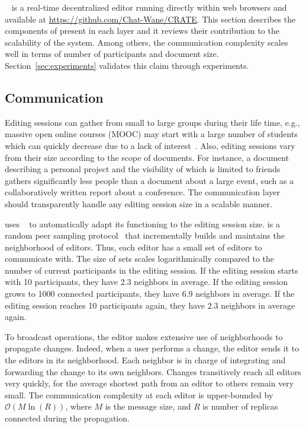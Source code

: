 \CRATE~\cite{nedelec2016crate} is a real-time decentralized editor running
directly within web browsers and available at
\url{https://github.com/Chat-Wane/CRATE}. 
This section describes the components of \CRATE present in each layer and it
reviews their contribution to the scalability of the system. Among others, the
communication complexity scales well in terms of number of participants and
document size. Section~\ref{sec:experiments} validates this claim through
experiments.


\subsection{Communication}
\label{subsec:communication}

Editing sessions can gather from small to large groups during their life time,
e.g., massive open online courses (MOOC) may start with a large number of
students which can quickly decrease due to a lack of
interest~\cite{breslow2013studying}. Also, editing sessions vary from their size
according to the scope of documents. For instance, a document describing a
personal project and the visibility of which is limited to friends gathers
significantly less people than a document about a large event, such as a
collaboratively written report about a conference. The communication layer
should transparently handle any editing session size in a scalable manner.


\CRATE uses \SPRAY~\cite{nedelec2015spray} to automatically adapt its
functioning to the editing session size. \SPRAY is a random peer sampling
protocol~\cite{jelasity2007gossip} that incrementally builds and maintains the
neighborhood of editors. Thus, each editor has a small set of editors to
communicate with. The size of sets scales logarithmically compared to the number
of current participants in the editing session. If the editing session starts
with 10 participants, they have 2.3 neighbors in average. If the editing session
grows to 1000 connected participants, they have 6.9 neighbors in average. If the
editing session reaches 10 participants again, they have 2.3 neighbors in
average again.

To broadcast operations, the editor makes extensive use of neighborhoods to
propagate changes. Indeed, when a user performs a change, the editor sends it to
the editors in its neighborhood. Each neighbor is in charge of integrating and
forwarding the change to its own neighbors. Changes transitively reach all
editors very quickly, for the average shortest path from an editor to others
remain very small. The communication complexity at each editor is upper-bounded
by $\mathcal{O}(M \ln(R))$, where $M$ is the message size, and $R$ is number of
replicas connected during the propagation.

